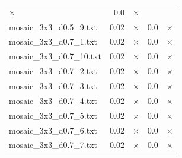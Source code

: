 \documentclass{article}
\begin{document}
\begin{center}
\begin{tabular}{lrrrr}
$\times$
 & 0.0 & 
$\times$
\\
mosaic\_3x3\_d0.5\_9.txt & 0.02 & 
$\times$
 & 0.0 & 
$\times$
\\
mosaic\_3x3\_d0.7\_1.txt & 0.02 & 
$\times$
 & 0.0 & 
$\times$
\\
mosaic\_3x3\_d0.7\_10.txt & 0.02 & 
$\times$
 & 0.0 & 
$\times$
\\
mosaic\_3x3\_d0.7\_2.txt & 0.02 & 
$\times$
 & 0.0 & 
$\times$
\\
mosaic\_3x3\_d0.7\_3.txt & 0.02 & 
$\times$
 & 0.0 & 
$\times$
\\
mosaic\_3x3\_d0.7\_4.txt & 0.02 & 
$\times$
 & 0.0 & 
$\times$
\\
mosaic\_3x3\_d0.7\_5.txt & 0.02 & 
$\times$
 & 0.0 & 
$\times$
\\
mosaic\_3x3\_d0.7\_6.txt & 0.02 & 
$\times$
 & 0.0 & 
$\times$
\\
mosaic\_3x3\_d0.7\_7.txt & 0.02 & 
$\times$
 & 0.0 & 
$\times$
\\
\hline\end{tabular}
\end{center}
\end{document}
